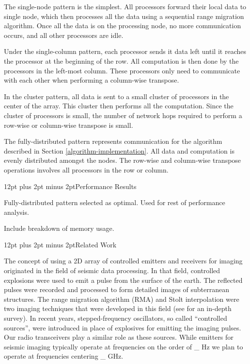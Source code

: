 \documentclass[twocolumn]{article}
\makeatletter
\def\section{\@startsection{section}{1}{\z@}{24pt plus 2 pt
minus 2 pt} {12pt plus 2pt minus 2pt}{\large\bf}}
\makeatother
\begin{document}
The single-node pattern is the simplest. All processors forward their local data to single node, which then processes all the data using a sequential range migration algorithm. Once all the data is on the processing node, no more communication occurs, and all other processors are idle. 

Under the single-column pattern, each processor sends it data left until it reaches the processor at the beginning of the row. All computation is then done by the processors in the left-most column. These processors only need to communicate with each other when performing a column-wise transpose.

In the cluster pattern, all data is sent to a small cluster of processors in the center of the array. This cluster then performs all the computation. Since the cluster of processors is small, the number of network hops required to perform a row-wise or column-wise transpose is small.

The fully-distributed pattern represents communication for the algorithm described in Section \ref{algorithm-implementation}. All data and computation is evenly distributed amongst the nodes. The row-wise and column-wise transpose operations involves all processors in the row or column.

\section{Performance Results}

Fully-distributed pattern selected as optimal. Used for rest of performance analysis.

Include breakdown of memory usage.

\section{Related Work}

The concept of using a 2D array of controlled emitters and receivers for imaging originated in the field of seismic data processing. In that field, controlled explosions were used to emit a pulse from the surface of the earth. The reflected pulses were recorded and processed to form detailed images of subterranean structures. The range migration algorithm (RMA) and Stolt interpolation were two imaging techniques that were developed in this field (see \cite{gazdag1984migration} for an in-depth survey). In recent years, stepped-frequency oscillators, so called ``controlled sources'', were introduced in place of explosives for emitting the imaging pulses. Our radio transceivers play a similar role as these sources. While emitters for seismic imaging typically operate at frequencies on the order of \_ Hz we plan to operate at frequencies centering \_ GHz.
\end{document}
